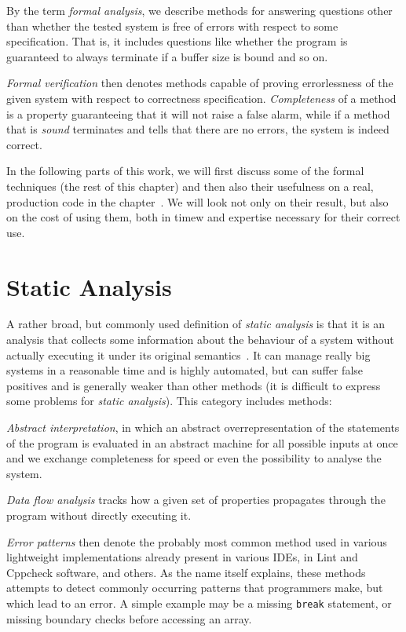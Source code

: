 By the term {\em formal analysis}, we describe methods for answering questions other than whether the tested system is free of errors with respect to some specification. That is, it includes questions like whether the program is guaranteed to always terminate if a buffer size is bound and so on.

{\em Formal verification} then denotes methods capable of proving errorlessness of the given system with respect to correctness specification. {\em Completeness} of a method is a property guaranteeing that it will not raise a false alarm, while if a method that is {\em sound} terminates and tells that there are no errors, the system is indeed correct.

In the following parts of this work, we will first discuss some of the formal techniques (the rest of this chapter) and then also their usefulness on a real, production code in the chapter~. We will look not only on their result, but also on the cost of using them, both in timew and expertise necessary for their correct use.

\section{Static Analysis}\label{chap:fav:staticAnalysis}
A rather broad, but commonly used definition of {\em static analysis} is that it is an analysis that collects some information about the behaviour of a system without actually executing it under its original semantics~\cite[Chap. 2.2]{KrenaVojnarOverview}. It can manage really big systems in a reasonable time and is highly automated, but can suffer false positives and is generally weaker than other methods (it is difficult to express some problems for {\em static analysis}). This category includes methods:

{\em Abstract interpretation}, in which an abstract overrepresentation of the statements of the program is evaluated in an abstract machine for all possible inputs at once and we exchange completeness for speed or even the possibility to analyse the system.

{\em Data flow analysis} tracks how a given set of properties propagates through the program without directly executing it.

{\em Error patterns} then denote the probably most common method used in various lightweight implementations already present in various IDEs, in Lint and Cppcheck software, and others. As the name itself explains, these methods attempts to detect commonly occurring patterns that programmers make, but which lead to an error. A simple example may be a missing {\tt break} statement, or missing boundary checks before accessing an array.

